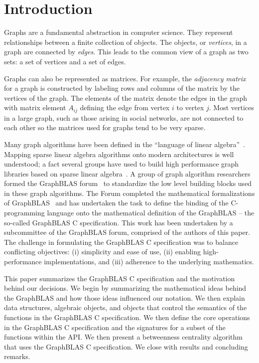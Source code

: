 \section{Introduction}
\label{sec:intro}

Graphs are a fundamental abstraction in computer science.  They represent
relationships between a finite collection of objects.   The objects, or
\emph{vertices}, in a graph are connected by \emph{edges}.  This leads
to the common view of a graph as two sets: a set of vertices and a set
of edges.

Graphs can also be represented as matrices.   For example, the
\emph{adjacency matrix} for a graph is constructed by labeling rows and
columns of the matrix by the vertices of the graph.  The elements of
the matrix denote the edges in the graph with matrix element $A_{ij}$
defining the edge from vertex $i$ to vertex $j$.  Most
vertices in a large graph, such as those arising in social networks,
are not connected to each other so the matrices used for graphs tend to
be very sparse.

Many graph algorithms have been defined in the ``language of linear
algebra''~\cite{kepner2011graph}.  Mapping sparse linear algebra algorithms 
onto modern architectures is well understood; a fact several 
groups have used to build high
performance graph libraries based on sparse linear algebra~\cite{combblas,
gadepally2015graphulo, gpi2016, sundaram2015graphmat}.  A group
of graph algorithm researchers formed the GraphBLAS
forum~\cite{graphblas_web} to standardize the low level building
blocks used in these graph algorithms.  The Forum completed the
mathematical formalizations of GraphBLAS~\cite{mathgraphblas16} and
has undertaken the task to define the
binding of the C-programming language onto the mathematical definition of
the GraphBLAS -- the so-called GraphBLAS C specification.   This work
has been undertaken by a subcommittee of the GraphBLAS forum, comprised of
the authors of this paper.  The challenge in formulating
the GraphBLAS C specification was to balance conflicting 
objectives: (i) simplicity and ease of use,
(ii) enabling high-performance implementations, and (iii) adherence to
the underlying mathematics.

This paper summarizes the GraphBLAS C specification and the
motivation behind our  decisions.  We begin by summarizing the 
mathematical ideas behind the GraphBLAS and how those ideas
influenced our notation.  We then explain data structures,
algebraic objects, and objects that control the semantics of the functions
in the GraphBLAS C specification.   We then define the
core operations in the GraphBLAS C  specification and the signatures
for a subset of the functions  within the API.  We then present a betweenness centrality 
algorithm that uses the GraphBLAS C  specification.  We close with results
and concluding remarks.
